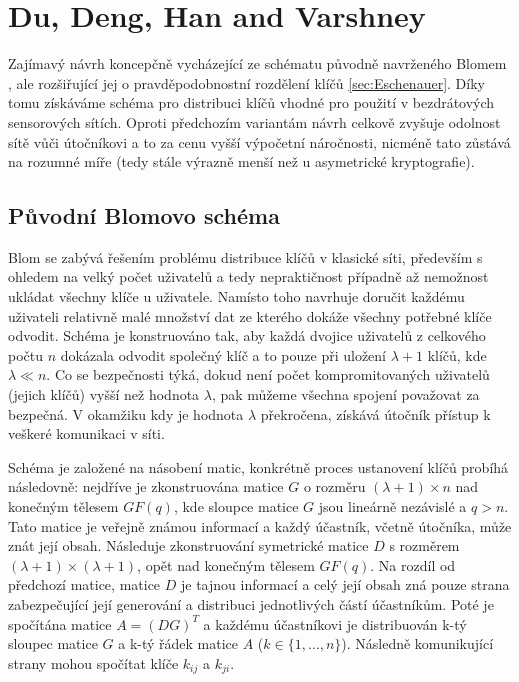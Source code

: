 \documentclass[11pt,final,twoside]{fithesis2}
\begin{document}
\section{Du, Deng, Han and Varshney}
Zajímavý návrh \cite{Du2005} koncepčně vycházející ze schématu původně navrženého Blomem \cite{Blom1985}, ale rozšiřující jej o pravděpodobnostní rozdělení klíčů \ref{sec:Eschenauer}.
Díky tomu získáváme schéma pro distribuci klíčů vhodné pro použití v bezdrátových sensorových sítích. Oproti předchozím variantám návrh celkově zvyšuje odolnost sítě vůči 
útočníkovi a to za cenu vyšší výpočetní náročnosti, nicméně tato zůstává na rozumné míře (tedy stále výrazně menší než u asymetrické kryptografie). 

\subsection{Původní Blomovo schéma}
Blom \cite{Blom1985} se zabývá řešením problému distribuce klíčů v klasické síti, především s ohledem na velký počet uživatelů a tedy nepraktičnost případně až nemožnost ukládat všechny klíče u uživatele.
Namísto toho navrhuje doručit každému uživateli relativně malé množství dat ze kterého dokáže všechny potřebné klíče odvodit. Schéma je konstruováno tak, aby každá dvojice uživatelů z celkového počtu $n$
dokázala odvodit společný klíč a to pouze při uložení $\lambda + 1$ klíčů, kde $\lambda \ll n$. Co se bezpečnosti týká, dokud není počet kompromitovaných uživatelů (jejich klíčů) vyšší než hodnota 
$\lambda$, pak můžeme všechna spojení považovat za bezpečná. V okamžiku kdy je hodnota $\lambda$ překročena, získává útočník přístup k veškeré komunikaci v síti. 

Schéma je založené na násobení matic, konkrétně proces ustanovení klíčů probíhá následovně: 
nejdříve je zkonstruována matice $G$ o rozměru $(\lambda + 1) \times n$ nad konečným tělesem $GF(q)$, kde sloupce matice $G$ jsou lineárně nezávislé a $q > n$.
Tato matice je veřejně známou informací a každý účastník, včetně útočníka, může znát její obsah. Následuje zkonstruování symetrické matice $D$ s rozměrem $(\lambda + 1) \times (\lambda + 1) $, 
opět nad konečným tělesem $GF(q)$. Na rozdíl od předchozí matice, matice $D$ je tajnou informací a celý její obsah zná pouze strana zabezpečující její generování a distribuci jednotlivých částí 
účastníkům. Poté je spočítána matice $A= (DG)^T$ a každému účastníkovi je distribuován k-tý sloupec matice $G$ a k-tý řádek matice $A$ ($k \in \{1, \dots , n\}$). Následně komunikující strany
mohou spočítat klíče $k_{ij}$ a $k_{ji}$.  
\end{document}
